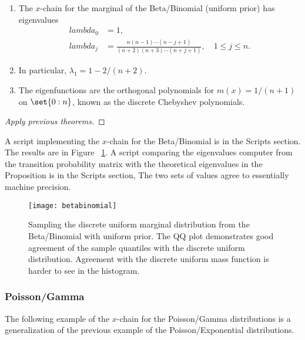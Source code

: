 \documentclass[12pt]{article}
\begin{document}
\begin{proposition}
    \begin{enumerate}
        \item
            The \( x \)-chain for the marginal of the Beta/Binomial (uniform
            prior) has eigenvalues
            \begin{align*}
                lambda_0 &= 1, \\
                lambda_j &= \frac{n(n-1) \cdots (n-j+1)}{(n+2)(n+3)
                \cdots (n+j+1)}, \quad 1 \le j \le n.
            \end{align*}
        \item
            In particular, \( \lambda_1 = 1 - 2/(n+2) \).
        \item
            The eigenfunctions are the orthogonal polynomials for \( m(x)
            = 1/(n+1) \) on \( \set{0:n} \), known as the discrete
            Chebyshev polynomials.
    \end{enumerate}
\end{proposition}

\begin{proof}
    [Apply previous theorems]
\end{proof}

A script implementing the \( x \)-chain for the Beta/Binomial is in the
Scripts section.  The results are in Figure~%
\ref{fig:spectralbounds:betabin}. A script comparing the eigenvalues
computer from the transition probability matrix with the theoretical
eigenvalues in the Proposition is in the Scripts section, The two sets
of values agree to essentially machine precision.

\begin{figure}
    \centering
    \texttt{[image: betabinomial]}
    \caption{Sampling the discrete uniform marginal distribution from
    the Beta/Binomial with uniform prior.  The QQ plot demonstrates good
    agreement of the sample quantiles with the discrete uniform
    distribution.  Agreement with the discrete uniform mass function is
    harder to see in the histogram.}%
    \label{fig:spectralbounds:betabin}
\end{figure}

\subsubsection*{Poisson/Gamma}

The following example of the \( x \)-chain for the Poisson/Gamma
distributions is a generalization of the previous example of the
Poisson/Exponential distributions.
\end{document}

